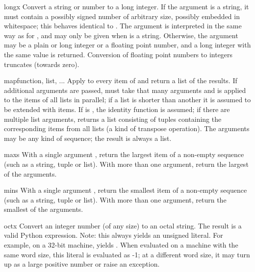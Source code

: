 \begin{funcdesc}{long}{x}
  Convert a string or number to a long integer.  If the argument is a
  string, it must contain a possibly signed number of
  arbitrary size, possibly embedded in whitespace;
  this behaves identical to .  The
   argument is interpreted in the same way as for
  , and may only be given when  is a string.
  Otherwise, the argument may be a plain or
  long integer or a floating point number, and a long integer with
  the same value is returned.    Conversion of floating
  point numbers to integers truncates (towards zero).
\end{funcdesc}

\begin{funcdesc}{map}{function, list, ...}
  Apply  to every item of  and return a list
  of the results.  If additional  arguments are passed,
   must take that many arguments and is applied to the
  items of all lists in parallel; if a list is shorter than another it
  is assumed to be extended with  items.  If 
  is , the identity function is assumed; if there are
  multiple list arguments,  returns a list consisting
  of tuples containing the corresponding items from all lists (a kind
  of transpose operation).  The  arguments may be any kind
  of sequence; the result is always a list.
\end{funcdesc}

\begin{funcdesc}{max}{s}
  With a single argument , return the largest item of a
  non-empty sequence (such as a string, tuple or list).  With more
  than one argument, return the largest of the arguments.
\end{funcdesc}

\begin{funcdesc}{min}{s}
  With a single argument , return the smallest item of a
  non-empty sequence (such as a string, tuple or list).  With more
  than one argument, return the smallest of the arguments.
\end{funcdesc}

\begin{funcdesc}{oct}{x}
  Convert an integer number (of any size) to an octal string.  The
  result is a valid Python expression.  Note: this always yields an
  unsigned literal.  For example, on a 32-bit machine, 
  yields .  When evaluated on a machine with the
  same word size, this literal is evaluated as -1; at a different word
  size, it may turn up as a large positive number or raise an
   exception.
\end{funcdesc}


